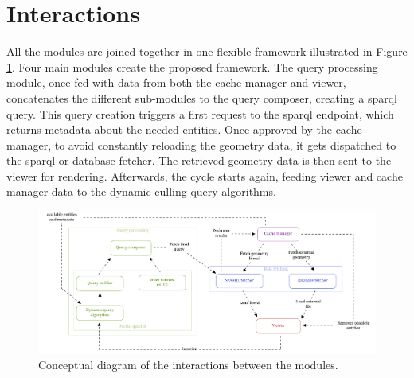 \section{Interactions} \label{sec:interactions}
All the modules are joined together in one flexible framework illustrated in Figure \ref{fig:interactionModules}. Four main modules create the proposed framework. The query processing module, once fed with data from both the cache manager and viewer, concatenates the different sub-modules to the query composer, creating a \ac{sparql} query. This query creation triggers a first request to the \ac{sparql} endpoint, which returns metadata about the needed entities. Once approved by the cache manager, to avoid constantly reloading the geometry data, it gets dispatched to the \ac{sparql} or database fetcher. The retrieved geometry data is then sent to the viewer for rendering. Afterwards, the cycle starts again, feeding viewer and cache manager data to the dynamic culling query algorithms.

\begin{figure}[H]
  \centering
  \includegraphics[width=\textwidth]{figures/pdf/interactions_concept.pdf}
  \caption[Interactions modular framework]{Conceptual diagram of the interactions between the modules.}
  \label{fig:interactionModules}
\end{figure}
